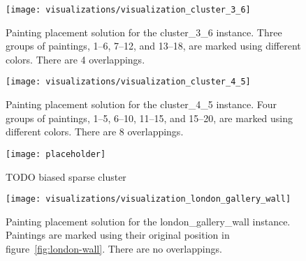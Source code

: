 \begin{figure}[h!]
    \texttt{[image: visualizations/visualization\_cluster\_3\_6]}
    \caption[Painting placement solution for the cluster\_3\_6 instance]
        { Painting placement solution for the cluster\_3\_6 instance.
    Three groups of paintings, \numrange{1}{6}, \numrange{7}{12}, and \numrange{13}{18}, are marked using different colors.
    There are 4 overlappings.}
    \label{fig:results:visualization-cluster-3-6}
\end{figure}

\begin{figure}[h!]
    \texttt{[image: visualizations/visualization\_cluster\_4\_5]}
    \caption[Painting placement solution for the cluster\_4\_5 instance]
        { Painting placement solution for the cluster\_4\_5 instance.
    Four groups of paintings, \numrange{1}{5}, \numrange{6}{10}, \numrange{11}{15}, and \numrange{15}{20}, are marked using different colors.
    There are 8 overlappings.}
    \label{fig:results:visualization-cluster-4-5}
\end{figure}

\begin{figure}[h!]
    \texttt{[image: placeholder]}
    \caption
    {TODO biased sparse cluster}
    \label{fig:results:visualization-biased-sparse-cluster}
\end{figure}

\begin{figure}[h!]
    \texttt{[image: visualizations/visualization\_london\_gallery\_wall]}
    \caption[Painting placement solution for the london\_gallery\_wall instance]
        { Painting placement solution for the london\_gallery\_wall instance.
    Paintings are marked using their original position in figure~\ref{fig:london-wall}.
    There are no overlappings.}
    \label{fig:results:visualization-london-gallery-wall}
\end{figure}


